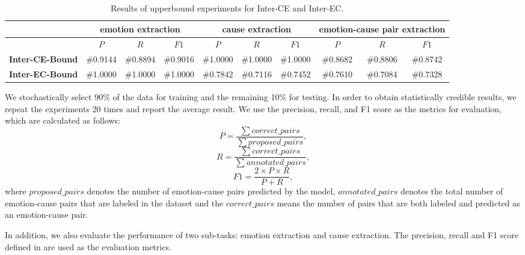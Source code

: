 \documentclass[11pt,a4paper]{article}
\begin{document}
\begin{table*}
	\small
	\centering
	
	\begin{tabular} {c|c|c|c|c|c|c|c|c|c}
		\hline
		& \multicolumn{3}{|c}{emotion extraction} & \multicolumn{3}{|c}{cause extraction} & \multicolumn{3}{|c}{emotion-cause pair extraction}\\
		\hline
		& $P$ & $R$ & $F1$ & $P$ & $R$ & $F1$ & $P$ & $R$ & $F1$ \\
		\hline
		\textbf{Inter-CE-Bound} & \#0.9144 & \#0.8894 & \#0.9016 & \#1.0000 & \#1.0000 & \#1.0000 & \#0.8682 & \#0.8806 & \#0.8742\\
		\textbf{Inter-EC-Bound} & \#1.0000 & \#1.0000 & \#1.0000 & \#0.7842 & \#0.7116 & \#0.7452 & \#0.7610 & \#0.7084 & \#0.7328\\
		
		\hline
	\end{tabular}
	\caption{Results of upperbound experiments for Inter-CE and Inter-EC.}
	\label{TableThree2}
\end{table*}

We stochastically select 90\% of the data for training and the remaining 10\% for testing. In order to obtain statistically credible results, we repeat the experiments 20 times and report the average result. We use the precision, recall, and F1 score as the metrics for evaluation, which are calculated as follows:
\begin{equation}
\label{eqn_example}
P= \frac {\sum correct\_pairs} {\sum proposed\_pairs},
\end{equation}
\begin{equation}
\label{eqn_example}
R= \frac {\sum correct\_pairs} {\sum annotated\_pairs},
\end{equation}
\begin{equation}
\label{eqn_example}
F1= \frac {2 \times P \times R} { P + R} ,
\end{equation}
where $ proposed\_pairs $ denotes the number of emotion-cause pairs predicted by the model, $ annotated\_pairs $ denotes the total number of emotion-cause pairs that are labeled in the dataset and the $ correct\_pairs $ means the number of pairs that are both labeled and predicted as an emotion-cause pair.

In addition, we also evaluate the performance of two sub-tasks: emotion extraction and cause extraction. The precision, recall and F1 score defined in \citet{gui2016event} are used as the evaluation metrics. 
\end{document}
